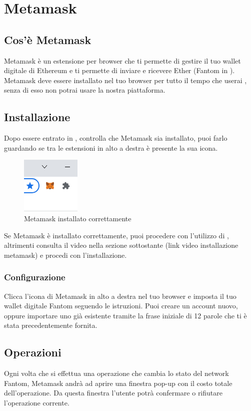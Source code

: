 \section{Metamask}\label{section:metamask}
\subsection{Cos'è Metamask}
Metamask è un estensione per browser che ti permette di gestire il tuo wallet digitale di Ethereum e ti permette di inviare e ricevere Ether (Fantom in \projectName{}).
Metamask deve essere installato nel tuo browser per tutto il tempo che userai \projectName{}, senza di esso non potrai usare la nostra piattaforma.
\subsection{Installazione}
Dopo essere entrato in \projectName{}, controlla che Metamask sia installato, puoi farlo guardando se tra le estensioni in alto a destra è presente la sua icona.

    \begin{figure}[htbp]
        \centering
        \includegraphics{immagini/metamask_installed.png}
        \caption{Metamask installato correttamente}
    \end{figure}   
 Se Metamask è installato correttamente, puoi procedere con l'utilizzo di \projectName, altrimenti consulta il video nella sezione sottostante (link video installazione metamask) e procedi con l'installazione.

\subsubsection{Configurazione}
Clicca l'icona di Metamask in alto a destra nel tuo browser e imposta il tuo wallet digitale Fantom seguendo le istruzioni.
Puoi creare un account nuovo, oppure importare uno già esistente tramite la frase iniziale di 12 parole che ti è stata precedentemente fornita.

\subsection{Operazioni}
Ogni volta che si effettua una operazione che cambia lo stato del network\glo{} Fantom\glo{}, Metamask andrà ad aprire una finestra pop-up con il costo totale dell'operazione.
Da questa finestra l'utente potrà confermare o rifiutare l'operazione corrente.

